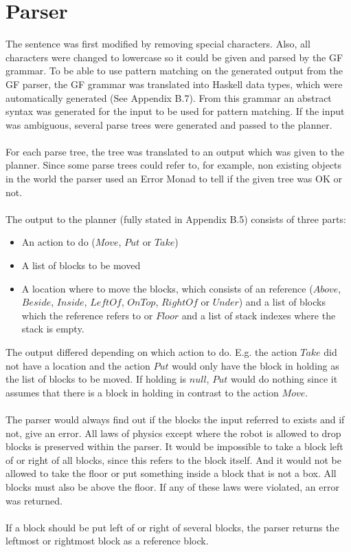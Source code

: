 \section{Parser}
\label{sec:parser}
The sentence was first modified by removing special characters. Also, all characters were changed to lowercase so it
could be given and parsed by the GF grammar. To be able to use pattern matching
on the generated output from the GF parser, the GF grammar was translated into
Haskell data types, which were automatically generated (See Appendix B.7). From
this grammar an abstract syntax was generated for the input to be used for
pattern matching. If the input was ambiguous, several parse trees were
generated and passed to the planner. \\\\
For each parse tree, the tree was translated to an output which was given to
the planner. Since some parse trees could refer to, for example, non existing
objects in the world the parser used an Error Monad to tell if the given tree
was OK or not. \\\\
The output to the planner (fully stated in Appendix B.5) consists of three parts:
\begin{itemize}
\item An action to do ($Move$, $Put$ or $Take$)
\item A list of blocks to be moved
\item A location where to move the blocks, which consists of an reference
        ($Above$, $Beside$, $Inside$, $LeftOf$, $OnTop$, $RightOf$ or $Under$)
        and a list of blocks which the reference refers to or $Floor$ and a
        list of stack indexes where the stack is empty.
\end{itemize}
The output differed depending on which action to do. E.g. the action $Take$ did
not have a location and the action $Put$ would only have the block in holding
as the list of blocks to be moved. If holding is $null$, $Put$ would do nothing
since it assumes that there is a block in holding in contrast to the action
$Move$.\\\\
The parser would always find out if the blocks the input referred to exists and
if not, give an error. All laws of physics except where the robot is allowed to
drop blocks is preserved within the parser. It would be impossible to take a
block left of or right of all blocks, since this refers to the block itself.
And it would not be allowed to take the floor or put something inside a block
that is not a box. All blocks must also be above the floor. If any of these
laws were violated, an error was returned.
 \\\\
If a block should be put left of or right of several blocks, the parser returns
the leftmost or rightmost block as a reference block. 

